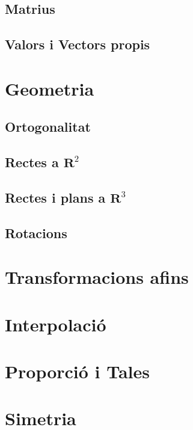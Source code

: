 \documentclass[12pt]{book}
\begin{document}
\begin{ExerciseList}
\subsection{Matrius}
 



\subsection{Valors i Vectors propis}




\section{Geometria}
\subsection{Ortogonalitat}



\subsection{Rectes a $\mathbf{R}^2$}




\subsection{Rectes i plans a $\mathbf{R}^3$}




\subsection{Rotacions}

\section{Transformacions afins}







\section{Interpolació}



\section{Proporció i Tales}


\section{Simetria}


\end{ExerciseList}
\newpage






\end{document}
